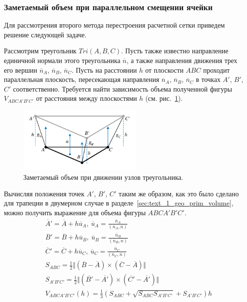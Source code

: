 \subsubsection{Заметаемый объем при параллельном смещении ячейки}

Для рассмотрения второго метода перестроения расчетной сетки приведем решение следующей задаче.

Рассмотрим треугольник $Tri(A, B, C)$.
Пусть также известно направление единичной нормали этого треугольника $\overline{n}$, а также направления движения трех его вершин $\overline{n}_A$, $\overline{n}_B$, $\overline{n}_C$.
Пусть на расстоянии $h$ от плоскости $ABC$ проходит параллельная плоскость, пересекающая направления $\overline{n}_A$, $\overline{n}_B$, $\overline{n}_C$ в точках $A'$, $B'$, $C'$ соответственно.
Требуется найти зависимость объема полученной фигуры $V_{ABCA'B'C'}$ от расстояния между плоскостями $h$ (см. рис.~\ref{fig:text_1_geo_prim_pyramid_partial}).

\begin{figure}[ht]
\centering
\includegraphics[width=0.55\textwidth]{./fig/3dr_pyramid_partial.pdf}
\singlespacing
{}\caption{Заметаемый объем при движении узлов треугольника.}
\label{fig:text_1_geo_prim_pyramid_partial}
\end{figure}

Вычисляя положения точек $A'$, $B'$, $C'$ таким же образом, как это было сделано для трапеции в двумерном случае в разделе~\ref{sec:text_1_geo_prim_volume}, можно получить выражение для объема фигуры $ABCA'B'C'$.
\begin{equation}\label{eqn:text_1_geo_prim_abca1b1c1}
	\begin{aligned}
		& \overline{A}' = \overline{A} + h \overline{u}_A, \ \overline{u}_A = \frac{\overline{n}_A}{(\overline{n}_A, \overline{n})} \\
		& \overline{B}' = \overline{B} + h \overline{u}_B, \ \overline{u}_B = \frac{\overline{n}_B}{(\overline{n}_B, \overline{n})} \\
		& \overline{C}' = \overline{C} + h \overline{u}_C, \ \overline{u}_C = \frac{\overline{n}_C}{(\overline{n}_C, \overline{n})} \\
		& S_{ABC} = \frac{1}{2} \Vert (\overline{B} - \overline{A}) \times (\overline{C} - \overline{A}) \Vert \\
		& S_{A'B'C'} = \frac{1}{2} \Vert (\overline{B'} - \overline{A'}) \times (\overline{C'} - \overline{A'}) \Vert \\
		& V_{ABCA'B'C'}(h) = \frac{1}{3} \left( S_{ABC} + \sqrt{S_{ABC} S_{A'B'C'}} + S_{A'B'C'} \right) h
	\end{aligned}
\end{equation}

